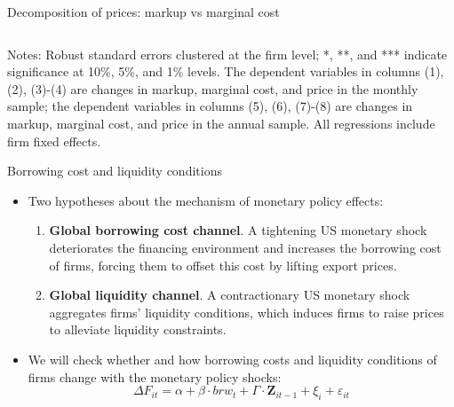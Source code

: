 \documentclass[10pt]{beamer}
\begin{document}
\begin{frame}{Decomposition of prices: markup vs marginal cost}
\begin{table}[htbp]
{\begin{threeparttable}
\begin{tabular}{lcccccccc}
    \end{tabular}
        \begin{tablenotes}
            \footnotesize
            \item Notes: Robust standard errors clustered at the firm level;  *, **, and *** indicate significance at 10\%, 5\%, and 1\% levels. The dependent variables in columns (1), (2), (3)-(4) are changes in markup, marginal cost, and price in the monthly sample; the dependent variables in columns (5), (6), (7)-(8) are changes in markup, marginal cost, and price in the annual sample. All regressions include firm fixed effects.
	\end{tablenotes}
    \end{threeparttable}
    }
    \label{tab.markup}
\end{table}
\end{frame}

\begin{frame}{Borrowing cost and liquidity conditions}
    \begin{itemize}
        \item Two hypotheses about the mechanism of monetary policy effects:
        \begin{enumerate}
            \item \textbf{Global borrowing cost channel}. A tightening US monetary shock deteriorates the financing environment and increases the borrowing cost of firms, forcing them to offset this cost by lifting export prices.
            \item \textbf{Global liquidity channel}. A contractionary US monetary shock aggregates firms' liquidity conditions, which induces firms to raise prices to alleviate liquidity constraints.
        \end{enumerate}
        \item We will check whether and how borrowing costs and liquidity conditions of firms change with the monetary policy shocks:
        \begin{equation}
            \Delta F_{it} = \alpha +\beta \cdot brw_{t}+ \Gamma \cdot \textbf{Z}_{it-1}+\xi_{i}+\varepsilon_{it} \label{reg.liquid}
        \end{equation}
    \end{itemize}
\end{frame}
\end{document}
